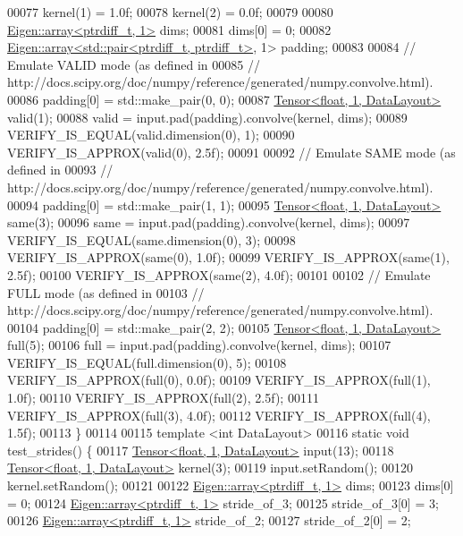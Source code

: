 \begin{DoxyCode}
00077   kernel(1) = 1.0f;
00078   kernel(2) = 0.0f;
00079 
00080   \hyperlink{class_eigen_1_1array}{Eigen::array<ptrdiff\_t, 1>} dims;
00081   dims[0] = 0;
00082   \hyperlink{class_eigen_1_1array}{Eigen::array<std::pair<ptrdiff\_t, ptrdiff\_t>}, 1> padding;
00083 
00084   \textcolor{comment}{// Emulate VALID mode (as defined in}
00085   \textcolor{comment}{// http://docs.scipy.org/doc/numpy/reference/generated/numpy.convolve.html).}
00086   padding[0] = std::make\_pair(0, 0);
00087   \hyperlink{class_eigen_1_1_tensor}{Tensor<float, 1, DataLayout>} valid(1);
00088   valid = input.pad(padding).convolve(kernel, dims);
00089   VERIFY\_IS\_EQUAL(valid.dimension(0), 1);
00090   VERIFY\_IS\_APPROX(valid(0), 2.5f);
00091 
00092   \textcolor{comment}{// Emulate SAME mode (as defined in}
00093   \textcolor{comment}{// http://docs.scipy.org/doc/numpy/reference/generated/numpy.convolve.html).}
00094   padding[0] = std::make\_pair(1, 1);
00095   \hyperlink{class_eigen_1_1_tensor}{Tensor<float, 1, DataLayout>} same(3);
00096   same = input.pad(padding).convolve(kernel, dims);
00097   VERIFY\_IS\_EQUAL(same.dimension(0), 3);
00098   VERIFY\_IS\_APPROX(same(0), 1.0f);
00099   VERIFY\_IS\_APPROX(same(1), 2.5f);
00100   VERIFY\_IS\_APPROX(same(2), 4.0f);
00101 
00102   \textcolor{comment}{// Emulate FULL mode (as defined in}
00103   \textcolor{comment}{// http://docs.scipy.org/doc/numpy/reference/generated/numpy.convolve.html).}
00104   padding[0] = std::make\_pair(2, 2);
00105   \hyperlink{class_eigen_1_1_tensor}{Tensor<float, 1, DataLayout>} full(5);
00106   full = input.pad(padding).convolve(kernel, dims);
00107   VERIFY\_IS\_EQUAL(full.dimension(0), 5);
00108   VERIFY\_IS\_APPROX(full(0), 0.0f);
00109   VERIFY\_IS\_APPROX(full(1), 1.0f);
00110   VERIFY\_IS\_APPROX(full(2), 2.5f);
00111   VERIFY\_IS\_APPROX(full(3), 4.0f);
00112   VERIFY\_IS\_APPROX(full(4), 1.5f);
00113 \}
00114 
00115 \textcolor{keyword}{template} <\textcolor{keywordtype}{int} DataLayout>
00116 \textcolor{keyword}{static} \textcolor{keywordtype}{void} test\_strides() \{
00117   \hyperlink{class_eigen_1_1_tensor}{Tensor<float, 1, DataLayout>} input(13);
00118   \hyperlink{class_eigen_1_1_tensor}{Tensor<float, 1, DataLayout>} kernel(3);
00119   input.setRandom();
00120   kernel.setRandom();
00121 
00122   \hyperlink{class_eigen_1_1array}{Eigen::array<ptrdiff\_t, 1>} dims;
00123   dims[0] = 0;
00124   \hyperlink{class_eigen_1_1array}{Eigen::array<ptrdiff\_t, 1>} stride\_of\_3;
00125   stride\_of\_3[0] = 3;
00126   \hyperlink{class_eigen_1_1array}{Eigen::array<ptrdiff\_t, 1>} stride\_of\_2;
00127   stride\_of\_2[0] = 2;

\end{DoxyCode}
